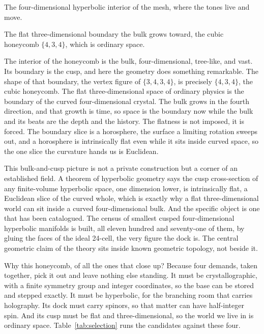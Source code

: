 \begin{definition}[Bulk]
The four-dimensional hyperbolic interior of the mesh, where the tones live and move.
\end{definition}

\begin{definition}[Cusp]
The flat three-dimensional boundary the bulk grows toward, the cubic honeycomb $\{4,3,4\}$, which is ordinary space.
\end{definition}

The interior of the honeycomb is the bulk, four-dimensional, tree-like, and vast. Its boundary is the cusp, and here the geometry does something remarkable. The shape of that boundary, the vertex figure of $\{3,4,3,4\}$, is precisely $\{4,3,4\}$, the cubic honeycomb. The flat three-dimensional space of ordinary physics is the boundary of the curved four-dimensional crystal. The bulk grows in the fourth direction, and that growth is time, so space is the boundary now while the bulk and its beats are the depth and the history. The flatness is not imposed, it is forced. The boundary slice is a horosphere, the surface a limiting rotation sweeps out, and a horosphere is intrinsically flat even while it sits inside curved space, so the one slice the curvature hands us is Euclidean.

This bulk-and-cusp picture is not a private construction but a corner of an established field. A theorem of hyperbolic geometry says the cusp cross-section of any finite-volume hyperbolic space, one dimension lower, is intrinsically flat, a Euclidean slice of the curved whole, which is exactly why a flat three-dimensional world can sit inside a curved four-dimensional bulk. And the specific object is one that has been catalogued. The census of smallest cusped four-dimensional hyperbolic manifolds is built, all eleven hundred and seventy-one of them, by gluing the faces of the ideal 24-cell, the very figure the dock is. The central geometric claim of the theory sits inside known geometric topology, not beside it.

Why this honeycomb, of all the ones that close up? Because four demands, taken together, pick it out and leave nothing else standing. It must be crystallographic, with a finite symmetry group and integer coordinates, so the base can be stored and stepped exactly. It must be hyperbolic, for the branching room that carries holography. Its dock must carry spinors, so that matter can have half-integer spin. And its cusp must be flat and three-dimensional, so the world we live in is ordinary space. Table~\ref{tab:selection} runs the candidates against these four.

